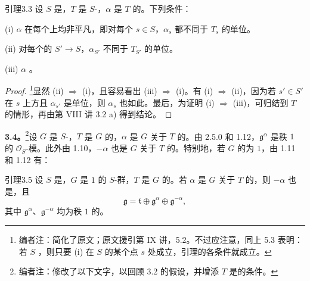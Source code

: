\begin{SGAresult}{引理}{3.3}
设 $S$ 是，$T$ 是 $S$-，$\alpha$ 是 $T$ 的。下列条件：

(i) $\alpha$ 在每个上均非平凡，即对每个 $s\in S$，$\alpha_s$ 都不同于 $T_s$ 的单位。

(ii) 对每个的 $S'\to S$，$\alpha_{S'}$ 不同于 $T_{S'}$ 的单位。

(iii)  $\alpha$ 。
\end{SGAresult}
\begin{proof}
\footnote[28]{编者注：简化了原文；原文援引第 IX 讲，5.2。不过应注意，同上 5.3 表明：若 $S$ ，则只要 (i) 在 $S$ 的某个点 $s$ 处成立，引理的各条件就成立。}显然 (ii) $\Rightarrow$ (i)，且容易看出 (iii) $\Rightarrow$ (i)。有 (i) $\Rightarrow$ (ii)，因为若 $s'\in S'$ 在 $s$ 上方且 $\alpha_{s'}$ 是单位，则 $\alpha_s$ 也如此。最后，为证明 (i) $\Rightarrow$ (iii)，可归结到 $T$ 的情形，再由第 VIII 讲 3.2 a) 得到结论。
\end{proof}
\textbf{3.4。}\footnote[29]{编者注：修改了以下文字，以回顾 3.2 的假设，并增添 $T$ 是的条件。}设 $G$ 是 $S$-，$T$ 是 $G$ 的，$\alpha$ 是 $G$ 关于 $T$ 的。由 2.5.0 和 1.12，$\mathfrak g^\alpha$ 是秩 $1$ 的 $\mathscr O_S$-模。此外由 1.10，$-\alpha$ 也是 $G$ 关于 $T$ 的。特别地，若 $G$ 的为 $1$，由 1.11 和 1.12 有：
\begin{SGAresult}{引理}{3.5}
设 $S$ 是，$G$ 是 $1$ 的 $S$-群，$T$ 是 $G$ 的。若 $\alpha$ 是 $G$ 关于 $T$ 的，则 $-\alpha$ 也是，且
\[
\mathfrak g=\mathfrak t\oplus\mathfrak g^\alpha\oplus\mathfrak g^{-\alpha},
\]
其中 $\mathfrak g^\alpha$、$\mathfrak g^{-\alpha}$ 均为秩 $1$ 的。
\end{SGAresult}
